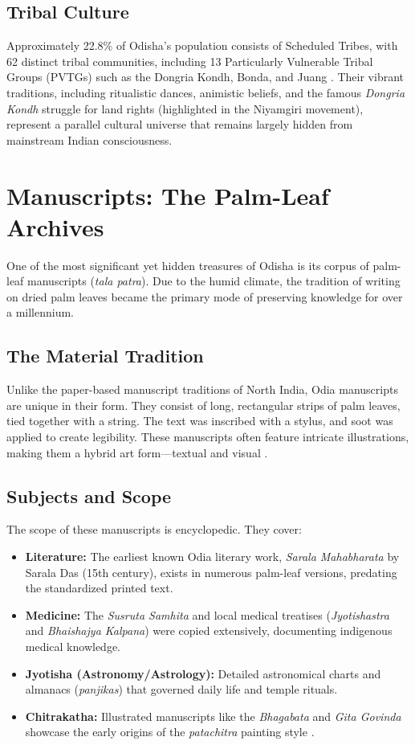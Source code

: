 \documentclass[12pt]{article}
\begin{document}
\subsection{Tribal Culture}
Approximately 22.8\% of Odisha’s population consists of Scheduled Tribes, with 62 distinct tribal communities, including 13 Particularly Vulnerable Tribal Groups (PVTGs) such as the Dongria Kondh, Bonda, and Juang \cite{census_2011}. Their vibrant traditions, including ritualistic dances, animistic beliefs, and the famous \textit{Dongria Kondh} struggle for land rights (highlighted in the Niyamgiri movement), represent a parallel cultural universe that remains largely hidden from mainstream Indian consciousness.

\section{Manuscripts: The Palm-Leaf Archives}
One of the most significant yet hidden treasures of Odisha is its corpus of palm-leaf manuscripts (\textit{tala patra}). Due to the humid climate, the tradition of writing on dried palm leaves became the primary mode of preserving knowledge for over a millennium.

\subsection{The Material Tradition}
Unlike the paper-based manuscript traditions of North India, Odia manuscripts are unique in their form. They consist of long, rectangular strips of palm leaves, tied together with a string. The text was inscribed with a stylus, and soot was applied to create legibility. These manuscripts often feature intricate illustrations, making them a hybrid art form—textual and visual \cite{dash_manuscripts}.

\subsection{Subjects and Scope}
The scope of these manuscripts is encyclopedic. They cover:
\begin{itemize}
    \item \textbf{Literature:} The earliest known Odia literary work, \textit{Sarala Mahabharata} by Sarala Das (15th century), exists in numerous palm-leaf versions, predating the standardized printed text.
    \item \textbf{Medicine:} The \textit{Susruta Samhita} and local medical treatises (\textit{Jyotishastra} and \textit{Bhaishajya Kalpana}) were copied extensively, documenting indigenous medical knowledge.
    \item \textbf{Jyotisha (Astronomy/Astrology):} Detailed astronomical charts and almanacs (\textit{panjikas}) that governed daily life and temple rituals.
    \item \textbf{Chitrakatha:} Illustrated manuscripts like the \textit{Bhagabata} and \textit{Gita Govinda} showcase the early origins of the \textit{patachitra} painting style \cite{senapati_patachitra}.
\end{itemize}
\end{document}
